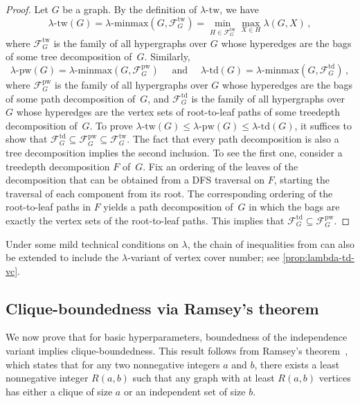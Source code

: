 \documentclass[11pt]{article}
\newcommand{\td}{\mathrm{td}}
\newcommand{\tw}{\mathrm{tw}}
\newcommand{\minmax}{\mathrm{minmax}}
\newcommand{\pw}{\mathrm{pw}}
\theoremstyle{plain}
\theoremstyle{definition}
\theoremstyle{remark}
\numberwithin{equation}{section}
\begin{document}
\begin{proof}
Let $G$ be a graph.
By the definition of $\lambda\text{-}\tw$, we have 
\[\lambda\text{-}\tw(G) = \lambda\text{-}\minmax(G,\mathcal{F}_G^{\tw})= \min_{H\in \mathcal{F}_G^{\tw}}\max_{X\in H}\lambda(G,X)\,,\]
where $\mathcal{F}_G^{\tw}$ is the family of all hypergraphs over $G$ whose hyperedges are the bags of some tree decomposition of~$G$.
Similarly, 
\[\lambda\text{-}\pw(G) = \lambda\text{-}\minmax(G,\mathcal{F}_G^{\pw})\quad \text{ and }\quad \lambda\text{-}\td(G) = \lambda\text{-}\minmax(G,\mathcal{F}_G^{\td})\,,\] 
where $\mathcal{F}_G^{\pw}$ is the family of all hypergraphs over $G$ whose hyperedges are the bags of some path decomposition of~$G$, and $\mathcal{F}_G^{\td}$ is the family of all hypergraphs over $G$ whose hyperedges are the vertex sets of root-to-leaf paths of some treedepth decomposition of~$G$.
To prove $\lambda\text{-}\tw(G)\le \lambda\text{-}\pw(G)\le \lambda\text{-}\td(G)$, it suffices to show that $\mathcal{F}_G^{\td}\subseteq\mathcal{F}_G^{\pw}\subseteq \mathcal{F}_G^{\tw}$.
The fact that every path decomposition is also a tree decomposition implies the second inclusion.
To see the first one, consider a treedepth decomposition $F$ of~$G$.
Fix an ordering of the leaves of the decomposition that can be obtained from a DFS traversal on $F$, starting the traversal of each component from its root.
The corresponding ordering of the root-to-leaf paths in $F$ yields a path decomposition of~$G$ in which the bags are exactly the vertex sets of the root-to-leaf paths.
This implies that $\mathcal{F}_G^{\td}\subseteq\mathcal{F}_G^{\pw}$.
\end{proof}

Under some mild technical conditions on $\lambda$, the chain of inequalities from  can also be extended to include the $\lambda$-variant of vertex cover number; see \cref{prop:lambda-td-vc}.

\subsection{Clique-boundedness via Ramsey's theorem}\label{sec:Ramsey}

We now prove that for basic hyperparameters, boundedness of the independence variant implies clique-boundedness.
This result follows from Ramsey's theorem~\cite{MR1576401}, which states that for any two nonnegative integers $a$ and $b$, there exists a least nonnegative integer $R(a,b)$ such that any graph with at least $R(a,b)$ vertices has either a clique of size $a$ or an independent set of size $b$.
\end{document}
